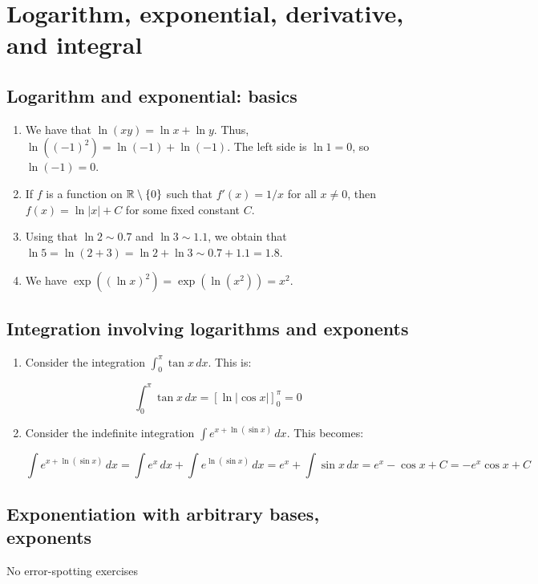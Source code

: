 \documentclass[10pt]{amsart}
\begin{document}
\section{Logarithm, exponential, derivative, and integral}

\subsection{Logarithm and exponential: basics}

\begin{enumerate}
\item We have that $\ln(xy) = \ln x + \ln y$. Thus, $\ln((-1)^2) =
  \ln(-1) + \ln(-1)$. The left side is $\ln 1 = 0$, so $\ln(-1) = 0$.
\item If $f$ is a function on $\mathbb{R} \setminus \{ 0 \}$ such that $f'(x)
  = 1/x$ for all $x \ne 0$, then $f(x) = \ln|x| + C$ for some fixed
  constant $C$.
\item Using that $\ln 2 \sim 0.7$ and $\ln 3 \sim 1.1$, we obtain that
  $\ln 5 = \ln(2 + 3) = \ln 2 + \ln 3 \sim 0.7 + 1.1 = 1.8$.
\item We have $\exp((\ln x)^2) = \exp(\ln(x^2)) = x^2$.
\end{enumerate}

\subsection{Integration involving logarithms and exponents}

\begin{enumerate}
\item Consider the integration $\int_0^\pi \tan x \, dx$. This is:

  $$\int_0^\pi \tan x \, dx = [\ln|\cos x|]_0^\pi = 0$$

\item Consider the indefinite integration $\int e^{x + \ln(\sin x)} \, dx$. This becomes:

  $$\int e^{x + \ln(\sin x)} \, dx = \int e^x \, dx + \int e^{\ln(\sin x)} \, dx = e^x + \int \sin x \, dx = e^x - \cos x +C = -e^x \cos x + C$$
  
\end{enumerate}

\subsection{Exponentiation with arbitrary bases, exponents}

No error-spotting exercises
\end{document}
